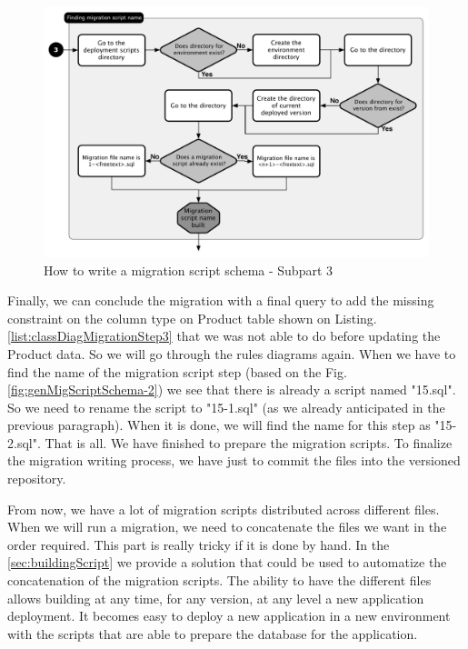 \begin{figure}[h]
        \centering
        \includegraphics[scale=0.60]{images/mig-schema-gen-3.pdf}
        \caption{How to write a migration script schema - Subpart 3}
        \label{fig:genMigScriptSchema-3}
\end{figure}

Finally, we can conclude the migration with a final query to add the missing constraint on the column type on Product table shown on Listing. \ref{list:classDiagMigrationStep3} that we was not able to do before updating the Product data. So we will go through the rules diagrams again. When we have to find the name of the migration script step (based on the Fig. \ref{fig:genMigScriptSchema-2}) we see that there is already a script named "15.sql". So we need to rename the script to "15-1.sql" (as we already anticipated in the previous paragraph). When it is done, we will find the name for this step as "15-2.sql". That is all. We have finished to prepare the migration scripts. To finalize the migration writing process, we have just to commit the files into the versioned repository.



From now, we have a lot of migration scripts distributed across different files. When we will run a migration, we need to concatenate the files we want in the order required. This part is really tricky if it is done by hand. In the \autoref{sec:buildingScript} we provide a solution that could be used to automatize the concatenation of the migration scripts. The ability to have the different files allows building at any time, for any version, at any level a new application deployment. It becomes easy to deploy a new application in a new environment with the scripts that are able to prepare the database for the application.

